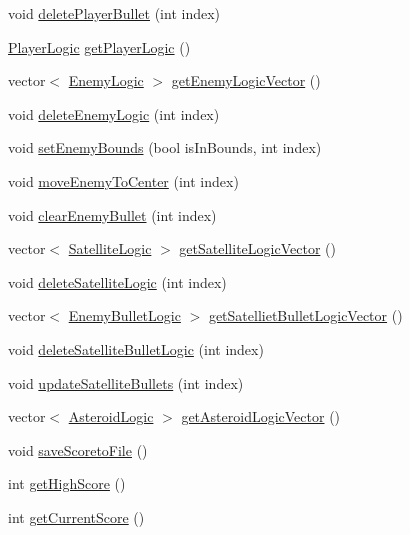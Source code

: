 \begin{DoxyCompactItemize}
\item 
void \hyperlink{class_game_logic_ae5629e5f0bf316435c6b4f40171755b9}{delete\+Player\+Bullet} (int index)
\item 
\hyperlink{class_player_logic}{Player\+Logic} \hyperlink{class_game_logic_a7aeb038bd7a0feef3377745ae334011c}{get\+Player\+Logic} ()
\item 
vector$<$ \hyperlink{class_enemy_logic}{Enemy\+Logic} $>$ \hyperlink{class_game_logic_afa1fd0270df0970723f3aef06431e2d8}{get\+Enemy\+Logic\+Vector} ()
\item 
void \hyperlink{class_game_logic_a34fd5f74aec0365dff0631384740a45b}{delete\+Enemy\+Logic} (int index)
\item 
void \hyperlink{class_game_logic_a48f8e18378ed00053d83da991fcad264}{set\+Enemy\+Bounds} (bool is\+In\+Bounds, int index)
\item 
void \hyperlink{class_game_logic_af355faaa66630a76a14ef0d7dc5adb54}{move\+Enemy\+To\+Center} (int index)
\item 
void \hyperlink{class_game_logic_aa8b94076dcd3ad6419c50d0036af97d6}{clear\+Enemy\+Bullet} (int index)
\item 
vector$<$ \hyperlink{class_satellite_logic}{Satellite\+Logic} $>$ \hyperlink{class_game_logic_a1110f512d8382700d322c6f1895810ea}{get\+Satellite\+Logic\+Vector} ()
\item 
void \hyperlink{class_game_logic_a3954ee824ac3acc8753f61f97d41ce89}{delete\+Satellite\+Logic} (int index)
\item 
vector$<$ \hyperlink{class_enemy_bullet_logic}{Enemy\+Bullet\+Logic} $>$ \hyperlink{class_game_logic_a230c5fb0084aa73c3b689c18a72b6adf}{get\+Satelliet\+Bullet\+Logic\+Vector} ()
\item 
void \hyperlink{class_game_logic_a4527756097ff2039fd91daad430e8598}{delete\+Satellite\+Bullet\+Logic} (int index)
\item 
void \hyperlink{class_game_logic_a353d4a44a09214c0ed73aa3a26b2ce0d}{update\+Satellite\+Bullets} (int index)
\item 
vector$<$ \hyperlink{class_asteroid_logic}{Asteroid\+Logic} $>$ \hyperlink{class_game_logic_a084386ea39d66e3963ba248f7affabe0}{get\+Asteroid\+Logic\+Vector} ()
\item 
void \hyperlink{class_game_logic_a594da37684d54d619214e8f96b80279c}{save\+Scoreto\+File} ()
\item 
int \hyperlink{class_game_logic_a05ad3bbd5acd9f0b41d1f1d29cac8017}{get\+High\+Score} ()
\item 
int \hyperlink{class_game_logic_a56e4499d60c8784c3bf34ab91a75e273}{get\+Current\+Score} ()
\end{DoxyCompactItemize}


